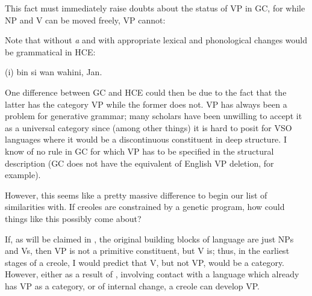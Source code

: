 This fact must immediately raise doubts about the status of
VP in GC, for while NP and V can be moved freely, VP cannot:

\label{ex:2:5}\z

\label{ex:2:6}\z

\label{ex:2:7}\z

\label{ex:2:8}\z
Note that  without \textit{a} and with appropriate lexical and phonological changes would be grammatical in HCE:

\ea\label{ex:2:9}
(i) bin si wan wahini, Jan.
\z

One difference between GC and HCE could then be due to the fact that the latter has the category VP while the former does not. VP has always been a problem for generative grammar; many scholars have been unwilling to accept it as a universal category since (among other things) it is hard to posit for VSO languages where it would be a discontinuous constituent in deep structure. I know of no rule in GC for which VP has to be specified in the structural description (GC does not have the equivalent of English VP deletion, for example).

However, this seems like a pretty massive difference to begin our list of similarities with. If creoles are constrained by a genetic program, how could things like this possibly come about?

If, as will be claimed in , the original building blocks of language are just NPs and Vs, then VP is not a primitive constituent, but V is; thus, in the earliest stages of a creole, I would predict that V, but not VP, would be a category. However, either as a result of , involving contact with a language which already has VP as a category, or of internal change, a creole can develop VP.\\\\

